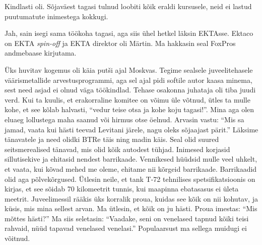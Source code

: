 Kindlasti oli. Sõjaväest tagasi 
tulnud loobiti kõik eraldi kursusele, neid ei lastud puutumatute 
inimestega kokkugi.


Jah, sain isegi sama töökoha tagasi, aga siis ühel hetkel läksin
EKTAsse. 
Ektaco on EKTA \emph{spin-off} ja EKTA direktor oli 
Märtin. Ma hakkasin seal FoxPros andmebaase kirjutama.

Üks huvitav kogemus oli käia putši ajal Moskvas. Tegime sealsele 
juveelitehasele 
väärismetallide arvestusprogrammi, aga sel ajal pidi softile autor kaasa 
minema, sest need asjad ei olnud väga töökindlad. Tehase 
osakonna juhataja oli tiba juudi verd. Kui ta kuulis, et 
erakorraline komitee on võimu üle võtnud, ütles ta mulle kohe, et see kõlab 
halvasti, \enquote{vedur teise otsa ja kohe koju tagasi!}. Mina aga olen eluaeg lollustega 
maha saanud või hirmus otse öelnud. Arvasin vastu: 
\enquote{Mis sa jamad, vaata kui hästi teevad
Levitani järele, 
nagu oleks sõjaajast pärit.} Läksime tänavatele ja need olidki 
BTRe täis ning madin käis. Seal olid 
suured seitsmerealised tänavad, mis olid kõik autodest tühjad. 
Inimesed korjasid sillutisekive ja ehitasid nendest barrikaade. Vennikesed 
hüüdsid mulle veel uhkelt, et vaata, kui kõvad mehed me oleme, ehitame nii kõrgeid barrikaade. Barrikaadid olid aga põlvekõrgused.
Ütlesin neile, et tank T-72 tehnilises 
spetsifikatsioonis on kirjas, et see sõidab 70 kilomeetrit tunnis, kui maapinna 
ebatasasus ei ületa meetrit. 
Juveelimessil rääkis üks korralik proua, kuidas see kõik on nii 
kohutav, ja küsis, mis mina sellest 
arvan. Ma ütlesin, et kõik on ju hästi. Proua imestas: \enquote{Mis mõttes hästi?} 
Ma siis seletasin: \enquote{Vaadake, seni on venelased tapnud kõiki teisi rahvaid, nüüd 
tapavad venelased venelasi.} Populaarsust ma sellega muidugi ei võitnud.


